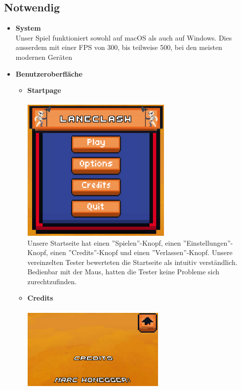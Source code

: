\subsection{Notwendig}
    \begin{itemize}
    \item \textbf{System} \\
        Unser Spiel funktioniert sowohl auf macOS als auch auf Windows. Dies ausserdem mit einer FPS von 300, bis teilweise 500, bei den meisten modernen Geräten
    \item \textbf{Benutzeroberfläche} \\
    \begin {itemize}
        \item \textbf{Startpage} \\
            \\
            \includegraphics[height=7cm]{resources/laneclash.png}\\
            Unsere Startseite hat einen ''Spielen''-Knopf, einen ''Einstellungen''-Knopf, einen ''Credits''-Knopf und einen ''Verlassen''-Knopf. Unsere vereinzelten Tester bewerteten die Startseite
        als intuitiv verständlich. Bedienbar mit der Maus, hatten die Tester keine Probleme sich zurechtzufinden.
        \item \textbf{Credits}\\
            \\
            \includegraphics*[width = 7cm]{resources/credits.png}\\

\end{itemize}
\end{itemize}
